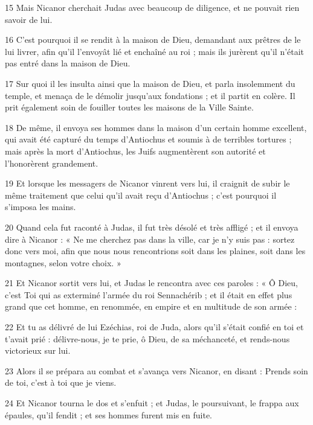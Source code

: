 \par 15 Mais Nicanor cherchait Judas avec beaucoup de diligence, et ne pouvait rien savoir de lui.

\par 16 C'est pourquoi il se rendit à la maison de Dieu, demandant aux prêtres de le lui livrer, afin qu'il l'envoyât lié et enchaîné au roi ; mais ils jurèrent qu'il n'était pas entré dans la maison de Dieu.

\par 17 Sur quoi il les insulta ainsi que la maison de Dieu, et parla insolemment du temple, et menaça de le démolir jusqu'aux fondations ; et il partit en colère. Il prit également soin de fouiller toutes les maisons de la Ville Sainte.

\par 18 De même, il envoya ses hommes dans la maison d'un certain homme excellent, qui avait été capturé du temps d'Antiochus et soumis à de terribles tortures ; mais après la mort d'Antiochus, les Juifs augmentèrent son autorité et l'honorèrent grandement.

\par 19 Et lorsque les messagers de Nicanor vinrent vers lui, il craignit de subir le même traitement que celui qu'il avait reçu d'Antiochus ; c'est pourquoi il s'imposa les mains.

\par 20 Quand cela fut raconté à Judas, il fut très désolé et très affligé ; et il envoya dire à Nicanor : « Ne me cherchez pas dans la ville, car je n’y suis pas : sortez donc vers moi, afin que nous nous rencontrions soit dans les plaines, soit dans les montagnes, selon votre choix. »

\par 21 Et Nicanor sortit vers lui, et Judas le rencontra avec ces paroles : « Ô Dieu, c'est Toi qui as exterminé l'armée du roi Sennachérib ; et il était en effet plus grand que cet homme, en renommée, en empire et en multitude de son armée :

\par 22 Et tu as délivré de lui Ezéchias, roi de Juda, alors qu'il s'était confié en toi et t'avait prié : délivre-nous, je te prie, ô Dieu, de sa méchanceté, et rends-nous victorieux sur lui.

\par 23 Alors il se prépara au combat et s'avança vers Nicanor, en disant : Prends soin de toi, c'est à toi que je viens.

\par 24 Et Nicanor tourna le dos et s'enfuit ; et Judas, le poursuivant, le frappa aux épaules, qu'il fendit ; et ses hommes furent mis en fuite.

